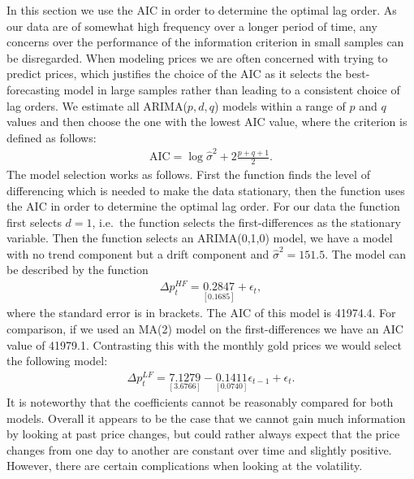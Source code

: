 \documentclass[a4paper]{article}
\theoremstyle{definition}
\begin{document}
In this section we use the AIC in order to determine the optimal lag order. As our data are of somewhat high frequency over a longer period of time, any concerns over the performance of the information criterion in small samples can be disregarded. When modeling prices we are often concerned with trying to predict prices, which justifies the choice of the AIC as it selects the best-forecasting model in large samples rather than leading to a consistent choice of lag orders. We estimate all ARIMA($p,d,q$) models within a range of $p$ and $q$ values and then choose the one with the lowest AIC value, where the criterion is defined as follows:
	\begin{align*}
	\text{AIC} = \log \hat\sigma^2 + 2 \frac{p+q+1}{2}.
	\end{align*}
The model selection works as follows. First the function finds the level of differencing which is needed to make the data stationary, then the function uses the AIC in order to determine the optimal lag order. For our data the function first selects $d=1$, i.e.\ the function selects the first-differences as the stationary variable. Then the function selects an ARIMA(0,1,0) model,  we have a model with no trend component but a drift component and $\hat\sigma^2 = 151.5$. The model can be described by the function
	\begin{align*}
	\Delta p^{HF}_{t} = \underset{[0.1685]}{0.2847} + \epsilon_{t},
	\end{align*}
where the standard error is in brackets. The AIC of this model is 41974.4. For comparison, if we used an MA(2) model on the first-differences we have an AIC value of 41979.1. Contrasting this with the monthly gold prices we would select the following model:
	\begin{align*}
	\Delta p^{LF}_{t} = \underset{[3.6766]}{7.1279} - \underset{[0.0740]}{0.1411}\epsilon_{t-1} + \epsilon_{t}.
	\end{align*}
It is noteworthy that the coefficients cannot be reasonably compared for both models. Overall it appears to be the case that we cannot gain much information by looking at past price changes, but could rather always expect that the price changes from one day to another are constant over time and slightly positive. However, there are certain complications when looking at the volatility. 
\end{document}
